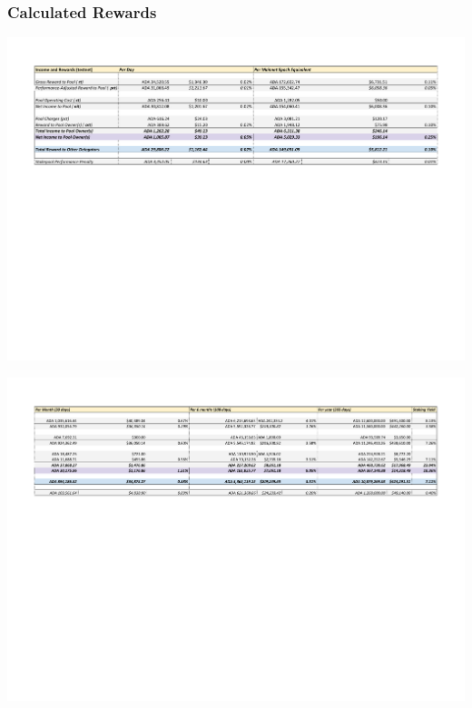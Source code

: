\documentclass[11pt,a4paper,dvipsnames,twosided,final]{article}
\begin{document}
\clearpage
\subsubsection*{Calculated Rewards}

\hspace{-0.65in}\begin{minipage}{\textwidth}
  \includegraphics[width=1.2\textwidth]{RCT4.pdf}
\vspace{-3.8in}

\includegraphics[width=1.2\textwidth]{RCT5.pdf}
\vspace{-3in}
\end{minipage}
\end{document}
